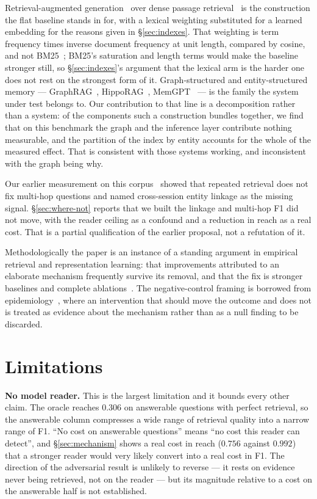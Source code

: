 \documentclass[11pt]{article}
\begin{document}
Retrieval-augmented generation~\cite{rag} over dense
passage retrieval~\cite{dpr} is the construction the flat baseline stands in
for, with a lexical weighting substituted for a learned embedding for the
reasons given in \S\ref{sec:indexes}. That weighting is term frequency times
inverse document frequency at unit length, compared by cosine, and not
BM25~\cite{bm25}; BM25's saturation and length terms would make the baseline
stronger still, so \S\ref{sec:indexes}'s argument that the lexical arm is the
harder one does not rest on the strongest form of it. Graph-structured and
entity-structured memory --- GraphRAG~\cite{graphrag}, HippoRAG~\cite{hipporag},
MemGPT~\cite{memgpt} --- is the family the system under test belongs to. Our
contribution to that line is a decomposition rather than a system: of the
components such a construction bundles together, we find that on this benchmark
the graph and the inference layer contribute nothing
measurable, and the partition of the index by entity accounts for the whole of
the measured effect. That is consistent with
those systems working, and inconsistent with the graph being why.

Our earlier measurement on this corpus~\cite{multihop} showed that repeated
retrieval does not fix multi-hop questions and named cross-session entity
linkage as the missing signal. \S\ref{sec:where-not} reports that we built the
linkage and multi-hop F1 did not move, with the reader ceiling as a confound
and a reduction in reach as a real cost. That is a partial qualification of the
earlier proposal, not a refutation of it.

Methodologically the paper is an instance of a standing argument in empirical
retrieval and representation learning: that improvements attributed to an
elaborate mechanism frequently survive its removal, and that the fix is
stronger baselines and complete ablations~\cite{neuralhype,realitycheck}. The
negative-control framing is borrowed from epidemiology~\cite{negativecontrol},
where an intervention that should move the outcome and does not is treated as
evidence about the mechanism rather than as a null finding to be discarded.

\section{Limitations}
\label{sec:limits}

\textbf{No model reader.} This is the largest limitation and it bounds every
other claim. The oracle reaches $0.306$ on answerable questions with perfect
retrieval, so the answerable column compresses a wide range of retrieval quality
into a narrow range of F1. ``No cost on answerable questions'' means ``no cost
this reader can detect'', and \S\ref{sec:mechanism} shows a real cost in reach
($0.756$ against $0.992$) that a stronger reader would very likely convert into
a real cost in F1. The direction of the adversarial result is unlikely to
reverse --- it rests on evidence never being retrieved, not on the reader ---
but its magnitude relative to a cost on the answerable half is not established.
\end{document}
